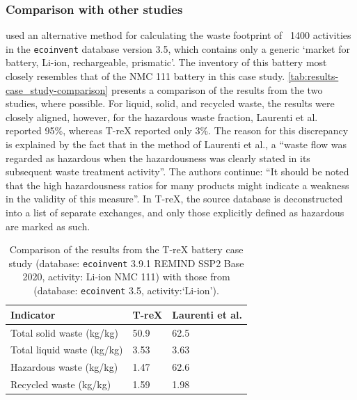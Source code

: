 \subsubsection{Comparison with other studies}\label{sec:results-case_study-comparison}

\cite{laurenti2023wastefootprint} used an alternative method for calculating the waste footprint of ~1400 activities in the \texttt{ecoinvent} database version 3.5, which contains only a generic `market for battery, Li-ion, rechargeable, prismatic'. The inventory of this battery most closely resembles that of the NMC 111 battery in this case study. \autoref{tab:results-case_study-comparison} presents a comparison of the results from the two studies, where possible. For liquid, solid, and recycled waste, the results were closely aligned, however, for the hazardous waste fraction, Laurenti et al. reported 95\%, whereas T-reX reported only 3\%. The reason for this discrepancy is explained by the fact that in the method of Laurenti et al., a ``waste flow was regarded as hazardous when the hazardousness
was clearly stated in its subsequent waste treatment activity''. The authors continue: ``It should be noted that the high hazardousness ratios for many products might indicate a weakness in the validity of this measure''. In T-reX, the source database is deconstructed into a list of separate exchanges, and only those explicitly defined as hazardous are marked as such.

\begin{table}[H]
    \centering
    \caption{Comparison of the results from the T-reX battery case study (database: \texttt{ecoinvent} 3.9.1 REMIND SSP2 Base 2020, activity: Li-ion NMC 111) with those from \cite{laurenti2023wastefootprint} (database: \texttt{ecoinvent} 3.5, activity:`Li-ion').}
    \label{tab:results-case_study-comparison}
    \begin{tabular}{lll}
        \toprule
        \textbf{Indicator}         & \textbf{T-reX} & \textbf{Laurenti et al.} \\
        \midrule
        Total solid waste (kg/kg)  & 50.9           & 62.5                     \\
        Total liquid waste (kg/kg) & 3.53           & 3.63                     \\
        Hazardous waste (kg/kg)    & 1.47           & 62.6                     \\
        Recycled waste (kg/kg)     & 1.59           & 1.98                     \\
        \bottomrule
    \end{tabular}
\end{table}

